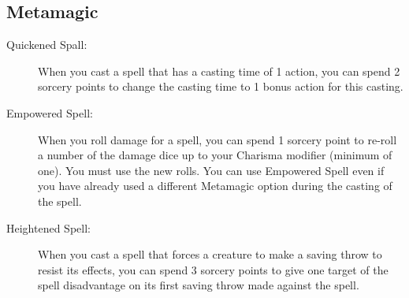 \documentclass[letterpaper,10pt,twoside,twocolumn,openany]{book}
\begin{document}
\subsection{Metamagic}

\begin{description}
	\item[Quickened Spall:] When you cast a spell that has a casting time of 1 action, you can spend 2 sorcery points to change the casting time to 1 bonus action for this casting.
	\item[Empowered Spell:] When you roll damage for a spell, you can spend 1
	sorcery point to re-roll a number of the damage dice up to your Charisma modifier (minimum of one). You must use the new rolls. You can use Empowered Spell even if you have already used a different Metamagic option during the casting of the spell.
	\item[Heightened Spell:] When you cast a spell that forces a creature to make a saving throw to resist its effects, you can spend 3 sorcery points to give one target of the spell disadvantage on its first saving throw made against the spell.
\end{description}

\subsection{}





\end{document}
